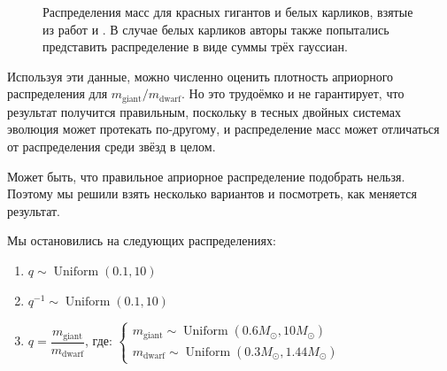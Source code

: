 \begin{figure}[h]
    \centering
    \caption{Распределения масс для красных гигантов и белых карликов, взятые из работ \cite{SDSS} и \cite{RedGiantMasses}. В случае белых карликов авторы также попытались представить распределение в виде суммы трёх гауссиан.}
    \label{fig:RG_WD_dists}
\end{figure}

Используя эти данные, можно численно оценить плотность априорного распределения для $m_\text{giant} / m_\text{dwarf}$. Но это трудоёмко и не гарантирует, что результат получится правильным, поскольку в тесных двойных системах эволюция может протекать по-другому, и распределение масс может отличаться от распределения среди звёзд в целом.

Может быть, что правильное априорное распределение подобрать нельзя. Поэтому мы решили взять несколько вариантов и посмотреть, как меняется результат.

Мы остановились на следующих распределениях:
\begin{enumerate}
    \item $q \sim \operatorname{Uniform}(0.1, 10)$
    \item $q^{-1} \sim \operatorname{Uniform}(0.1, 10)$
    \item $q = \dfrac{m_\text{giant}}{m_\text{dwarf}}$, где: $
    \begin{cases}
        m_\text{giant} \sim \operatorname{Uniform}(0.6 M_\odot, 10 M_\odot) \\
        m_\text{dwarf} \sim \operatorname{Uniform}(0.3 M_\odot, 1.44 M_\odot)
    \end{cases}
    $
\end{enumerate}

